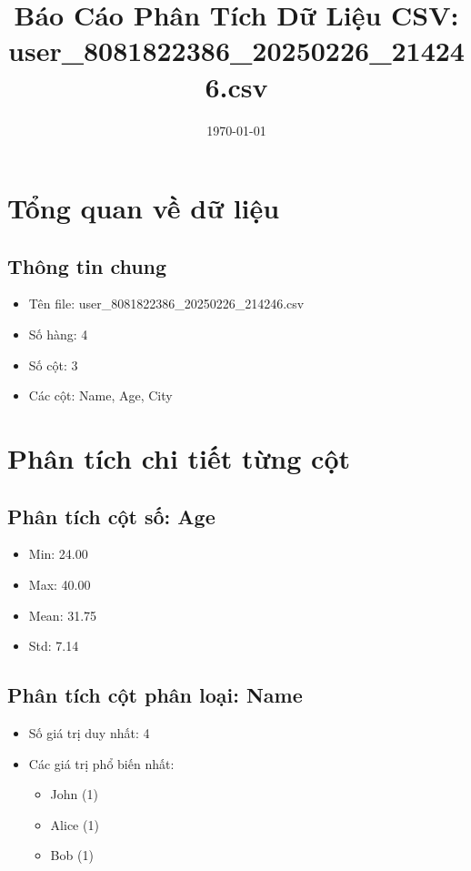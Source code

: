 \documentclass[12pt]{article}
\title{Báo Cáo Phân Tích Dữ Liệu CSV: user\_8081822386\_20250226\_214246.csv}
\author{}
\date{\today}
\begin{document}
\maketitle
\thispagestyle{empty}

\newpage
\tableofcontents
\newpage

\section{Tổng quan về dữ liệu}

\subsection{Thông tin chung}
\begin{itemize}
    \item Tên file: user\_8081822386\_20250226\_214246.csv
    \item Số hàng: 4
    \item Số cột: 3
    \item Các cột: Name, Age, City
\end{itemize}

\section{Phân tích chi tiết từng cột}

\subsection{Phân tích cột số: Age}
\begin{itemize}
    \item Min: 24.00
    \item Max: 40.00
    \item Mean: 31.75
    \item Std: 7.14
\end{itemize}

\subsection{Phân tích cột phân loại: Name}
\begin{itemize}
    \item Số giá trị duy nhất: 4
    \item Các giá trị phổ biến nhất:
    \begin{itemize}
        \item John (1)
        \item Alice (1)
        \item Bob (1)
    \end{itemize}
\end{itemize}
\end{document}
